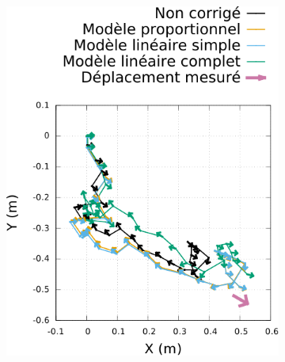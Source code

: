 \begin{figure}[h]
\begin{subfigure}{0.28\paperwidth}
        \includegraphics[type=pdf,ext=.pdf,read=.pdf,width=1.0\linewidth]{../plot/OdometryCMAES/readsTraj2}
    \end{subfigure}
    \begin{subfigure}{0.28\paperwidth}
        \centering

\end{subfigure}
\end{figure}

